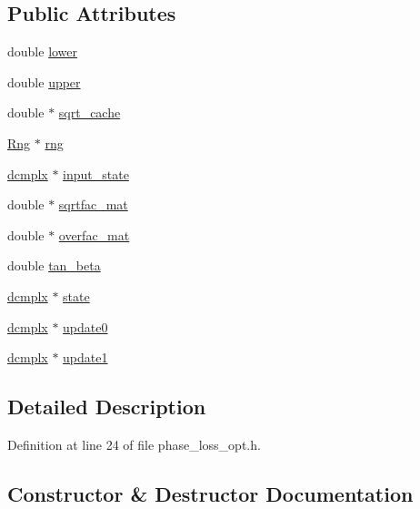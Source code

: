 \subsection*{Public Attributes}
\begin{DoxyCompactItemize}
\item 
double \hyperlink{class_phase_a8b7dbdfafd0e3c84dba4138cace2e00b}{lower}
\item 
double \hyperlink{class_phase_abe5215ac7a99447da0f2075e87b6e1d1}{upper}
\item 
double $\ast$ \hyperlink{class_phase_a9508675d9cd23e96e4e5af0f3514d64e}{sqrt\+\_\+cache}
\item 
\hyperlink{rng_8h_a0d95a1c4bd7f6516941df17732a09356}{Rng} $\ast$ \hyperlink{class_phase_abcd241887b2113672f6dc94877b79079}{rng}
\item 
\hyperlink{phase__loss__opt_8h_a98ebca80a317b58c1386b356909f7dea}{dcmplx} $\ast$ \hyperlink{class_phase_a33f2132e12b166e3c7fe0059f67c71f9}{input\+\_\+state}
\item 
double $\ast$ \hyperlink{class_phase_a64295bfa90607498ff8c544122afc3f9}{sqrtfac\+\_\+mat}
\item 
double $\ast$ \hyperlink{class_phase_a76beec42b9bfdcd105edcb8505bab934}{overfac\+\_\+mat}
\item 
double \hyperlink{class_phase_a5ed12bc03ed5641e7d6486aefbc33ee3}{tan\+\_\+beta}
\item 
\hyperlink{phase__loss__opt_8h_a98ebca80a317b58c1386b356909f7dea}{dcmplx} $\ast$ \hyperlink{class_phase_ab563c75af841b7c481f805d8a026518e}{state}
\item 
\hyperlink{phase__loss__opt_8h_a98ebca80a317b58c1386b356909f7dea}{dcmplx} $\ast$ \hyperlink{class_phase_a29c2f7fd9df0afc222d810d037ea9ded}{update0}
\item 
\hyperlink{phase__loss__opt_8h_a98ebca80a317b58c1386b356909f7dea}{dcmplx} $\ast$ \hyperlink{class_phase_aef5f586464d8609c933b2c28afc1fbf1}{update1}
\end{DoxyCompactItemize}


\subsection{Detailed Description}


Definition at line 24 of file phase\+\_\+loss\+\_\+opt.\+h.



\subsection{Constructor \& Destructor Documentation}
\hypertarget{class_phase_a693a2d20b39fa8a91bf5f4c1afa3b2e2}{}
